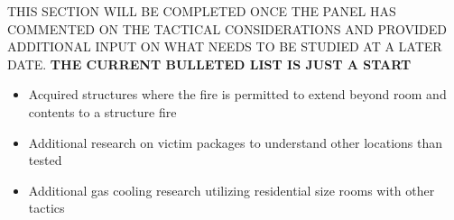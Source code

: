 \documentclass[12pt,oneside]{book}
\begin{document}
THIS SECTION WILL BE COMPLETED ONCE THE PANEL HAS COMMENTED ON THE TACTICAL CONSIDERATIONS AND PROVIDED ADDITIONAL INPUT ON WHAT NEEDS TO BE STUDIED AT A LATER DATE. \bf{THE CURRENT BULLETED LIST IS JUST A START}

\normalfont

\begin{itemize}
	\item{Acquired structures where the fire is permitted to extend beyond room and contents to a structure fire}
	\item{Additional research on victim packages to understand other locations than tested}
	\item{Additional gas cooling research utilizing residential size rooms with other tactics}
\end{itemize}





\clearpage
\end{document}
